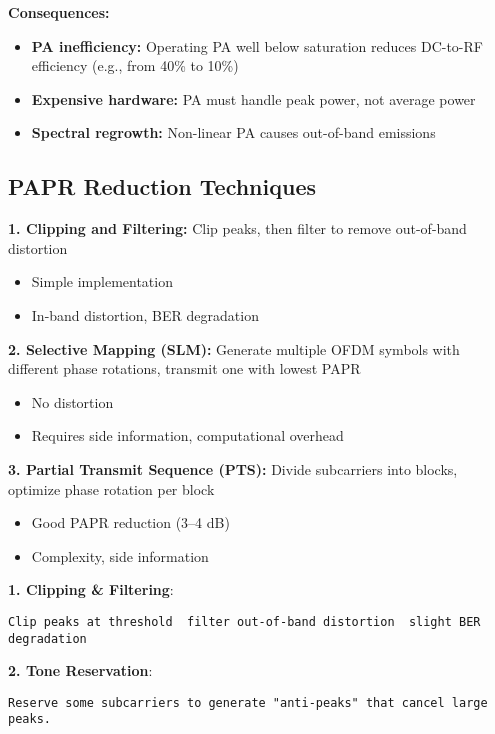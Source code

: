 \textbf{Consequences:}
\begin{itemize}
\item[\texttimes] \textbf{PA inefficiency:} Operating PA well below saturation reduces DC-to-RF efficiency (e.g., from 40\% to 10\%)
\item[\texttimes] \textbf{Expensive hardware:} PA must handle peak power, not average power
\item[\texttimes] \textbf{Spectral regrowth:} Non-linear PA causes out-of-band emissions
\end{itemize}

\subsection{PAPR Reduction Techniques}

\textbf{1. Clipping and Filtering:} Clip peaks, then filter to remove out-of-band distortion
\begin{itemize}
\item[\checkmark] Simple implementation
\item[\texttimes] In-band distortion, BER degradation
\end{itemize}

\textbf{2. Selective Mapping (SLM):} Generate multiple OFDM symbols with different phase rotations, transmit one with lowest PAPR
\begin{itemize}
\item[\checkmark] No distortion
\item[\texttimes] Requires side information, computational overhead
\end{itemize}

\textbf{3. Partial Transmit Sequence (PTS):} Divide subcarriers into blocks, optimize phase rotation per block
\begin{itemize}
\item[\checkmark] Good PAPR reduction (3--4 dB)
\item[\texttimes] Complexity, side information
\end{itemize}

\textbf{1. Clipping \& Filtering}:

\begin{verbatim}
Clip peaks at threshold  filter out-of-band distortion  slight BER degradation
\end{verbatim}

\textbf{2. Tone Reservation}:

\begin{verbatim}
Reserve some subcarriers to generate "anti-peaks" that cancel large peaks.
\end{verbatim}

